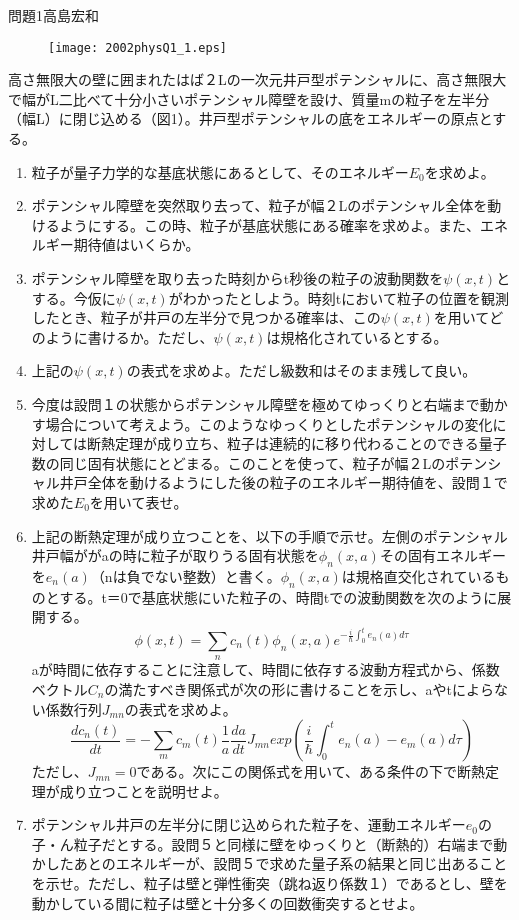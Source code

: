 \documentclass[fleqn]{jbook}
\begin{document}
\begin{question}{問題1}{高島宏和}
\begin{figure}[htbp]
\begin{center}
\texttt{[image: 2002physQ1\_1.eps]}
\end{center}
\end{figure}
高さ無限大の壁に囲まれたはば２Lの一次元井戸型ポテンシャルに、高さ無限大で幅がL二比べて十分小さいポテンシャル障壁を設け、質量mの粒子を左半分（幅L）に閉じ込める（図1）。井戸型ポテンシャルの底をエネルギーの原点とする。
\begin{enumerate}
\item 粒子が量子力学的な基底状態にあるとして、そのエネルギー$E_0$を求めよ。
\item ポテンシャル障壁を突然取り去って、粒子が幅２Lのポテンシャル全体を動けるようにする。この時、粒子が基底状態にある確率を求めよ。また、エネルギー期待値はいくらか。
\item ポテンシャル障壁を取り去った時刻からt秒後の粒子の波動関数を$\psi (x,t)$とする。今仮に$\psi (x,t)$がわかったとしよう。時刻tにおいて粒子の位置を観測したとき、粒子が井戸の左半分で見つかる確率は、この$\psi (x,t)$を用いてどのように書けるか。ただし、$\psi (x,t)$は規格化されているとする。
\item 上記の$\psi (x,t)$の表式を求めよ。ただし級数和はそのまま残して良い。
\item 今度は設問１の状態からポテンシャル障壁を極めてゆっくりと右端まで動かす場合について考えよう。このようなゆっくりとしたポテンシャルの変化に対しては断熱定理が成り立ち、粒子は連続的に移り代わることのできる量子数の同じ固有状態にとどまる。このことを使って、粒子が幅２Lのポテンシャル井戸全体を動けるようにした後の粒子のエネルギー期待値を、設問１で求めた$E_0$を用いて表せ。
\item 上記の断熱定理が成り立つことを、以下の手順で示せ。左側のポテンシャル井戸幅ががaの時に粒子が取りうる固有状態を$ \phi_n(x,a)$その固有エネルギーを$e_n (a)$（nは負でない整数）と書く。$ \phi_n(x,a)$は規格直交化されているものとする。t＝0で基底状態にいた粒子の、時間tでの波動関数を次のように展開する。
\begin{equation}
\phi (x,t)=\sum _n c_n(t) \phi_n(x,a) e^{ -\frac{i}{\hbar} \int _0 ^t {e_n(a)d\tau}}
\end{equation}
aが時間に依存することに注意して、時間に依存する波動方程式から、係数ベクトル${C_n}$の満たすべき関係式が次の形に書けることを示し、aやtによらない係数行列$J_{mn}$の表式を求めよ。
\begin{equation}
\frac{dc_n(t)}{dt}=-\sum _m c_m(t) \frac{1}{a} \frac{da}{dt} J_{mn} exp \left(\frac{i}{\hbar} \int _0 ^t e_n(a)-e_m(a) d\tau \right)
\end{equation}
ただし、$J_{mn}=0$である。次にこの関係式を用いて、ある条件の下で断熱定理が成り立つことを説明せよ。
\item ポテンシャル井戸の左半分に閉じ込められた粒子を、運動エネルギー$e_0$の子・ん粒子だとする。設問５と同様に壁をゆっくりと（断熱的）右端まで動かしたあとのエネルギーが、設問５で求めた量子系の結果と同じ出あることを示せ。ただし、粒子は壁と弾性衝突（跳ね返り係数１）であるとし、壁を動かしている間に粒子は壁と十分多くの回数衝突するとせよ。
\end{enumerate}
\end{question}
\end{document}
